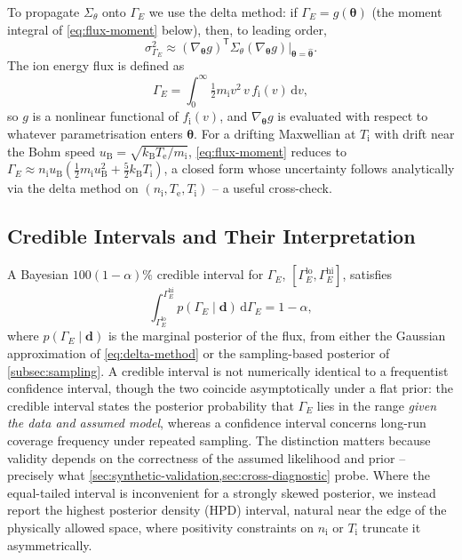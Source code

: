 To propagate $\Sigma_{\theta}$ onto $\Gamma_{E}$ we use the delta method: if $\Gamma_{E} = g(\boldsymbol{\theta})$ (the moment integral of \cref{eq:flux-moment} below), then, to leading order,
\begin{equation}
\sigma_{\Gamma_{E}}^{2} \approx \left(\nabla_{\boldsymbol{\theta}} g\right)^{\mathsf{T}} \Sigma_{\theta} \left(\nabla_{\boldsymbol{\theta}} g\right)\Big|_{\boldsymbol{\theta} = \hat{\boldsymbol{\theta}}}.
\label{eq:delta-method}
\end{equation}
The ion energy flux is defined as
\begin{equation}
\Gamma_{E} = \int_{0}^{\infty} \tfrac{1}{2} m_{\mathrm{i}} v^{2} \, v\, f_{\mathrm{i}}(v) \, \mathrm{d}v ,
\label{eq:flux-moment}
\end{equation}
so $g$ is a nonlinear functional of $f_{\mathrm{i}}(v)$, and $\nabla_{\boldsymbol{\theta}} g$ is evaluated with respect to whatever parametrisation enters $\boldsymbol{\theta}$. For a drifting Maxwellian at $T_{\mathrm{i}}$ with drift near the Bohm speed $u_{\mathrm{B}} = \sqrt{k_{\mathrm{B}} T_{\mathrm{e}} / m_{\mathrm{i}}}$, \cref{eq:flux-moment} reduces to $\Gamma_{E} \approx n_{\mathrm{i}} u_{\mathrm{B}} \left(\tfrac{1}{2} m_{\mathrm{i}} u_{\mathrm{B}}^{2} + \tfrac{5}{2} k_{\mathrm{B}} T_{\mathrm{i}}\right)$, a closed form whose uncertainty follows analytically via the delta method on $(n_{\mathrm{i}}, T_{\mathrm{e}}, T_{\mathrm{i}})$ -- a useful cross-check.

\subsection{Credible Intervals and Their Interpretation}
\label{subsec:credible}

A Bayesian $100(1-\alpha)\%$ credible interval for $\Gamma_{E}$, $\left[\Gamma_{E}^{\text{lo}}, \Gamma_{E}^{\text{hi}}\right]$, satisfies
\begin{equation}
\int_{\Gamma_{E}^{\text{lo}}}^{\Gamma_{E}^{\text{hi}}} p(\Gamma_{E} \mid \mathbf{d}) \, \mathrm{d}\Gamma_{E} = 1 - \alpha,
\label{eq:credible-interval}
\end{equation}
where $p(\Gamma_{E} \mid \mathbf{d})$ is the marginal posterior of the flux, from either the Gaussian approximation of \cref{eq:delta-method} or the sampling-based posterior of \cref{subsec:sampling}. A credible interval is not numerically identical to a frequentist confidence interval, though the two coincide asymptotically under a flat prior: the credible interval states the posterior probability that $\Gamma_{E}$ lies in the range \emph{given the data and assumed model}, whereas a confidence interval concerns long-run coverage frequency under repeated sampling. The distinction matters because validity depends on the correctness of the assumed likelihood and prior -- precisely what \cref{sec:synthetic-validation,sec:cross-diagnostic} probe. Where the equal-tailed interval is inconvenient for a strongly skewed posterior, we instead report the highest posterior density (HPD) interval, natural near the edge of the physically allowed space, where positivity constraints on $n_{\mathrm{i}}$ or $T_{\mathrm{i}}$ truncate it asymmetrically.

